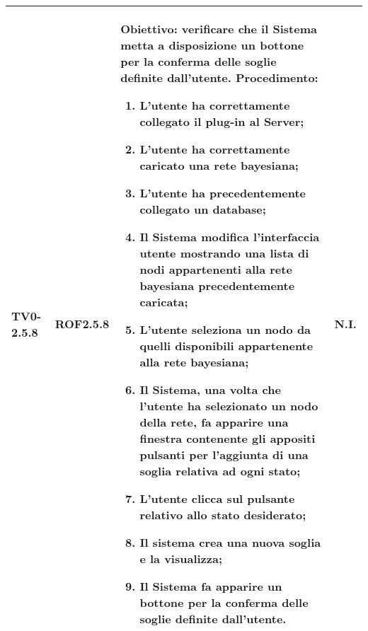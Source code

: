\begin{longtable}{|C{.15\textwidth}|C{.13\textwidth}|m{.65\textwidth}|C{.08\textwidth}|}
TV0-2.5.8 & ROF2.5.8 &
	\textbf{Obiettivo}: verificare che il Sistema metta a disposizione un bottone per la conferma delle soglie definite dall'utente. \newline
	\textbf{Procedimento}:
	\begin{enumerate}
		\item L'utente ha correttamente collegato il plug-in al Server;
		\item L'utente ha correttamente caricato una rete bayesiana;
		\item L'utente ha precedentemente collegato un database;
		\item Il Sistema modifica l'interfaccia utente mostrando una lista di nodi appartenenti alla rete bayesiana precedentemente caricata;
		\item L'utente seleziona un nodo da quelli disponibili appartenente alla rete bayesiana;
		\item Il Sistema, una volta che l'utente ha selezionato un nodo della rete, fa apparire una finestra contenente gli appositi pulsanti per l'aggiunta di una soglia relativa ad ogni stato;
		\item L'utente clicca sul pulsante relativo allo stato desiderato;
		\item Il sistema crea una nuova soglia e la visualizza;
		\item Il Sistema fa apparire un bottone per la conferma delle soglie definite dall'utente.
	\end{enumerate}
	& N.I. \\
\hline


\end{longtable}
